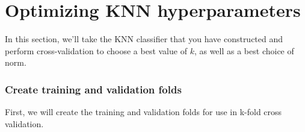 \documentclass[11pt]{article}
\begin{document}
    \hypertarget{optimizing-knn-hyperparameters}{%
\section{Optimizing KNN
hyperparameters}\label{optimizing-knn-hyperparameters}}

In this section, we'll take the KNN classifier that you have constructed
and perform cross-validation to choose a best value of \(k\), as well as
a best choice of norm.

    \hypertarget{create-training-and-validation-folds}{%
\subsubsection{Create training and validation
folds}\label{create-training-and-validation-folds}}

First, we will create the training and validation folds for use in
k-fold cross validation.
\end{document}
